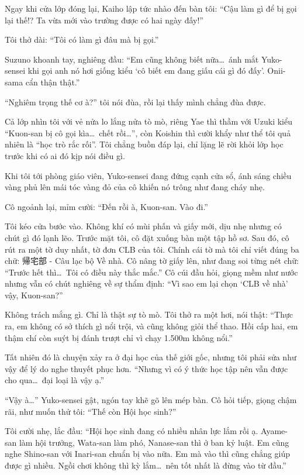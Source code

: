 \documentclass[../main.tex]{subfiles}
\begin{document}
Ngay khi cửa lớp đóng lại, Kaiho lập tức nhào đến bàn tôi: ``Cậu làm gì để bị gọi lại thế!? Ta vừa mới vào trường được có hai ngày đấy!''

Tôi thở dài: ``Tôi có làm gì đâu mà bị gọi.''

Suzuno khoanh tay, nghiêng đầu: ``Em cũng không biết nữa\dots\ ánh mắt Yuko-sensei khi gọi anh nó hơi giống kiểu `cô biết em đang giấu cái gì đó đấy'. Onii-sama cẩn thận thật.''

``Nghiêm trọng thế cơ à?'' tôi nói đùa, rồi lại thấy mình chẳng đùa được.

Cả lớp nhìn tôi với vẻ nửa lo lắng nửa tò mò, riêng Yae thì thầm với Uzuki kiểu ``Kuon-san bị cô gọi kìa\dots\ chết rồi\dots'', còn Koishin thì cười khẩy như thể tôi quả nhiên là ``học trò rắc rối''. Tôi chẳng buồn đáp lại, chỉ lặng lẽ rời khỏi lớp học trước khi có ai đó kịp nói điều gì.

\ct

Khi tôi tới phòng giáo viên, Yuko-sensei đang đứng cạnh cửa sổ, ánh sáng chiều vàng phủ lên mái tóc vàng đỏ của cô khiến nó trông như đang cháy nhẹ.

Cô ngoảnh lại, mỉm cười: ``Đến rồi à, Kuon-san. Vào đi.''

Tôi kéo cửa bước vào. Không khí có mùi phấn và giấy mới, dịu nhẹ nhưng có chút gì đó lạnh lẽo. Trước mặt tôi, cô đặt xuống bàn một tập hồ sơ. Sau đó, cô rút ra một tờ duy nhất, tờ đơn CLB của tôi. Chính cái tờ mà tôi chỉ viết đúng ba chữ: 帰宅部 - Câu lạc bộ Về nhà. Cô nâng tờ giấy lên, như đang soi từng nét chữ: ``Trước hết thì\dots\ Tôi có điều này thắc mắc.'' Cô cúi đầu hỏi, giọng mềm như nước nhưng vẫn có chút nghiêng về sự thẩm định: ``Vì sao em lại chọn `CLB về nhà' vậy, Kuon-san?''

Không trách mắng gì. Chỉ là thật sự tò mò. Tôi thở ra một hơi, nói thật: ``Thực ra, em không có sở thích gì nổi trội, và cũng không giỏi thể thao. Hồi cấp hai, em thậm chí còn suýt bị đánh trượt chỉ vì chạy 1.500m không nổi.''

Tất nhiên đó là chuyện xảy ra ở đại học của thế giới gốc, nhưng tôi phải sửa như vậy để lý do nghe thuyết phục hơn. ``Nhưng vì có ý thức học tập nên vẫn được cho qua\dots\ đại loại là vậy ạ.''

``Vậy à\dots'' Yuko-sensei gật, ngón tay khẽ gõ lên mép bàn. Cô hỏi tiếp, giọng chậm rãi, như muốn thử tôi: ``Thế còn Hội học sinh?''

Tôi cười nhẹ, lắc đầu: ``Hội học sinh đang có nhiều nhân lực lắm rồi ạ. Ayame-san làm hội trưởng, Wata-san làm phó, Nanase-san thì ở ban kỷ luật. Em cũng nghe Shino-san với Inari-san chuẩn bị vào nữa. Em mà vào thì cũng chẳng giúp được gì nhiều. Ngồi chơi không thì kỳ lắm\dots\ nên tốt nhất là đừng vào từ đầu.''
\end{document}
